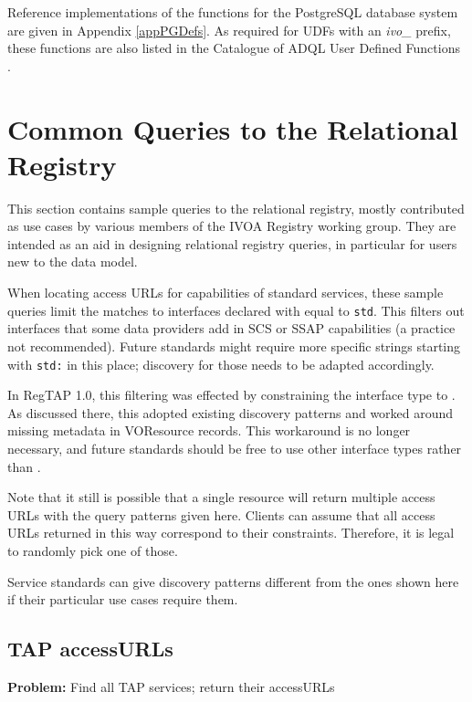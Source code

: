 \documentclass[11pt,a4paper]{ivoa}
\begin{document}
Reference implementations of the functions for the PostgreSQL
database system are given in Appendix \ref{appPGDefs}.  As required for
UDFs with an \emph{ivo\_} prefix, these functions are also listed in the
Catalogue of ADQL User Defined Functions \citep{2023ivoa.spec.1117C}.



\section{Common Queries to the Relational Registry}

\label{sample_queries}

This section contains sample queries to the relational registry,
mostly contributed as use cases by various members of the IVOA Registry
working group.  They are intended as an aid in designing relational
registry queries, in particular for users new to the data model.

When locating access URLs for capabilities of standard services, these
sample queries limit the matches to interfaces declared with
 equal to \verb|std|.
This filters out  interfaces that some data providers
add in SCS or SSAP capabilities (a practice not recommended).
Future standards might require more specific strings starting with
\verb|std:| in this place; discovery for those needs to be adapted
accordingly.

In RegTAP 1.0, this filtering was effected by constraining the interface
type to .  As discussed there, this adopted
existing discovery patterns and worked around missing metadata in
VOResource records.   This workaround is no
longer necessary, and future standards should be free to use other
interface types rather than .

Note that it still is possible that a single resource will return
multiple access URLs with the query patterns given here.  Clients can
assume that all access URLs returned in this way correspond to their
constraints.  Therefore, it is legal to randomly pick one of those.

Service standards can give discovery patterns different from the ones
shown here if their particular use cases require them.

\subsection{TAP accessURLs}
\textbf{Problem:} Find all TAP services; return their accessURLs
\end{document}
